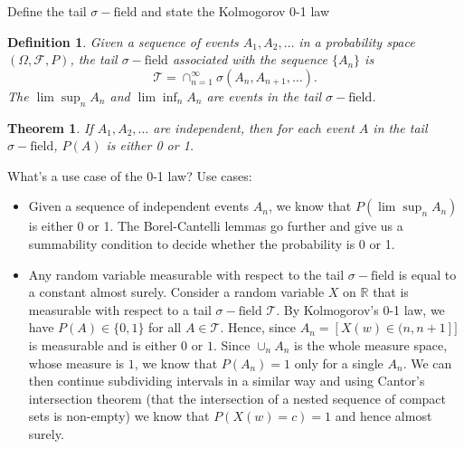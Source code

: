 \documentclass[avery5388,grid,frame]{flashcards}
\newcommand{\R}{\mathbb{R}}
\newcommand{\sigf}{\sigma-\text{field}}
\newcommand{\F}{\mathcal F}
\newtheorem*{theorem}{Theorem}
\newtheorem*{definition}{Definition}
\begin{document}
\begin{flashcard}
    {Define the tail $\sigf$ and state the Kolmogorov 0-1 law}
    \begin{definition}
        Given a sequence of events $A_1, A_2, \dots$ in a probability space $(\Omega, \F, P)$, the tail $\sigf$ associated with the sequence $\{ A_n \}$ is
        $$\mathcal T = \cap_{n=1}^\infty \sigma(A_n, A_{n+1}, \dots).$$
        The $\lim \sup_n A_n$ and $\lim \inf_n A_n$ are events in the tail $\sigf$.
    \end{definition}

    \begin{theorem}
        If $A_1, A_2, \dots$ are independent, then for each event $A$ in the tail $\sigf$, $P(A)$ is either 0 or 1.
    \end{theorem}

\end{flashcard}


\begin{flashcard}
    {What's a use case of the 0-1 law?}
    Use cases:
    \begin{itemize}
        \item Given a sequence of independent events $A_n$, we know that $P(\lim \sup_n A_n)$ is either 0 or 1. The Borel-Cantelli lemmas go further and give us a summability condition to decide whether the probability is 0 or 1.
        \item Any random variable measurable with respect to the tail $\sigf$ is equal to a constant almost surely. Consider a random variable $X$ on $\R$ that is measurable with respect to a tail $\sigf$ $\mathcal T$. By Kolmogorov's 0-1 law, we have $P(A) \in \{ 0, 1\}$ for all $A \in \mathcal T$. Hence, since $A_n = [X(w) \in (n,n+1] ]$ is measurable and is either $0$ or $1$. Since $\cup_n A_n$ is the whole measure space, whose measure is $1$, we know that $P(A_n) = 1$ only for a single $A_n$. We can then continue subdividing intervals in a similar way and using Cantor's intersection theorem (that the intersection of a nested sequence of compact sets is non-empty) we know that $P(X(w) = c) = 1$ and hence almost surely.
    \end{itemize}
\end{flashcard}
\end{document}
